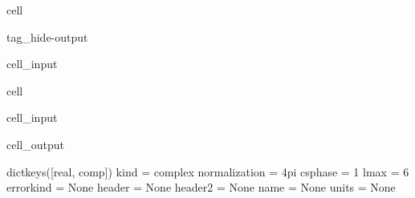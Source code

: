 \documentclass[letterpaper,table,10pt,english]{jupyterBook}
\begin{document}
\begin{sphinxuseclass}{cell}
\begin{sphinxuseclass}{tag_hide-output}\begin{sphinxVerbatimInput}

\begin{sphinxuseclass}{cell_input}
\begin{sphinxVerbatim}[commandchars=\\\{\}]
   
\end{sphinxVerbatim}

\end{sphinxuseclass}\end{sphinxVerbatimInput}

\end{sphinxuseclass}
\end{sphinxuseclass}
\begin{sphinxuseclass}{cell}\begin{sphinxVerbatimInput}

\begin{sphinxuseclass}{cell_input}
\begin{sphinxVerbatim}[commandchars=\\\{\}]
\PYG{p}{[}\PYG{p}{]}\PYG{p}{[}\PYG{p}{]}
\PYG{p}{[}\PYG{p}{]}\PYG{p}{[}\PYG{p}{]}\PYG{p}{[}\PYG{p}{]}
\end{sphinxVerbatim}

\end{sphinxuseclass}\end{sphinxVerbatimInput}
\begin{sphinxVerbatimOutput}

\begin{sphinxuseclass}{cell_output}
\begin{sphinxVerbatim}[commandchars=\\\{\}]
dict\PYGZus{}keys([\PYGZsq{}real\PYGZsq{}, \PYGZsq{}comp\PYGZsq{}])
kind = \PYGZsq{}complex\PYGZsq{}
normalization = \PYGZsq{}4pi\PYGZsq{}
csphase = \PYGZhy{}1
lmax = 6
error\PYGZus{}kind = None
header = None
header2 = None
name = None
units = None
\end{sphinxVerbatim}

\end{sphinxuseclass}\end{sphinxVerbatimOutput}

\end{sphinxuseclass}
\end{document}
